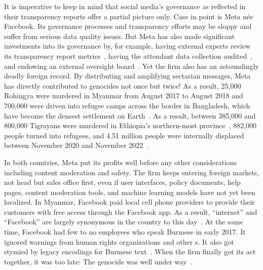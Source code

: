 It is imperative to keep in mind that social media's governance as reflected in
their transparency reports offer a partial picture only. Case in point is Meta
n\'ee Facebook. Its governance processes and transparency efforts may be sloppy
and suffer from serious data quality issues. But Meta has also made significant
investments into its governance by, for example, having external experts review
its transparency report metrics~\cite{BradfordGriselea2019}, having the
attendant data collection audited~\cite{Sarang2022}, and endowing an external
oversight board~\cite{BoteroMarinoGreeneea2020}. Yet the firm also has an
astoundingly deadly foreign record. By distributing and amplifying sectarian
messages, Meta has directly contributed to genocides not once but twice! As a
result, 25,000 Rohingya were murdered in Myanmar from August 2017 to August 2018
and 700,000 were driven into refugee camps across the border in Bangladesh,
which have become the densest settlement on
Earth~\cite{DeGuzman2022,HumanRightsCouncil2018}. As a result, between 385,000
and 800,000 Tigrayans were murdered in Ethiopia's northern-most
province~\cite{AnnysVandenBemptea2021,ChothiaBekit2022}, 882,000 people turned
into refugees, and 4.51 million people were internally displaced between
November 2020 and November 2022~\cite{UNICEF2023}.

In both countries, Meta put its profits well before any other considerations
including content moderation and safety. The firm keeps entering foreign
markets, not head but sales office first, even if user interfaces, policy
documents, help pages, content moderation tools, and machine learning models
have not yet been localized. In Myanmar, Facebook paid local cell phone
providers to provide their customers with free access through the Facebook app.
As a result, ``internet'' and ``Facebook'' are largely synonymous in the country
to this day~\cite{Strom2016}. At the same time, Facebook had few to no employees
who speak Burmese in early 2017. It ignored warnings from human rights
organizations and other s. It also got stymied by legacy encodings for
Burmese text~\cite{LaGrowPruzan2019,Wade2022}. When the firm finally got its act
together, it was too late: The genocide was well under
way~\cite{McLaughlin2018,MilkoOrtutay2022,Mozur2018,Ortutay2022}.


